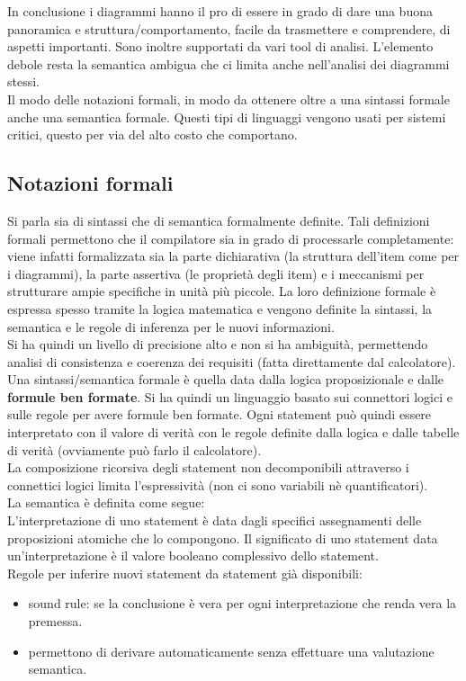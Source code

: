 In conclusione i diagrammi hanno il pro di essere in grado di dare una buona panoramica e struttura/comportamento, facile da trasmettere e comprendere, di aspetti importanti. Sono inoltre supportati da vari tool di analisi. L'elemento debole resta la semantica ambigua che ci limita anche nell'analisi dei diagrammi stessi.\\

Il modo delle notazioni formali, in modo da ottenere oltre a una sintassi formale anche una semantica formale. Questi tipi di linguaggi vengono usati per sistemi critici, questo per via del alto costo che comportano.

\subsection{Notazioni formali}
Si parla sia di sintassi che di semantica formalmente definite. Tali definizioni formali permettono che il compilatore sia in grado di processarle completamente: viene infatti formalizzata sia la parte dichiarativa (la struttura dell’item come per i diagrammi), la parte assertiva (le proprietà degli item) e i meccanismi per strutturare ampie specifiche in unità più piccole. La loro definizione formale è espressa spesso tramite la logica matematica e vengono definite la sintassi, la semantica e le regole di inferenza per le nuovi informazioni.\\
Si ha quindi un livello di precisione alto e non si ha ambiguità, permettendo analisi di consistenza e coerenza dei requisiti (fatta direttamente dal calcolatore).\\

Una sintassi/semantica formale è quella data dalla logica proposizionale e dalle \textbf{formule ben formate}. Si ha quindi un linguaggio basato sui connettori logici e sulle regole per avere formule ben formate. Ogni statement può quindi essere interpretato con il valore di verità con le regole definite dalla logica e dalle tabelle di verità (ovviamente può farlo il calcolatore).\\
La composizione ricorsiva degli statement non decomponibili attraverso i connettici logici limita l’espressività (non ci sono variabili nè quantificatori).\\
La semantica è definita come segue: \\
L’interpretazione di uno statement è data dagli specifici assegnamenti delle proposizioni atomiche che lo compongono. Il significato di uno statement data un’interpretazione è il valore booleano complessivo dello statement.\\
Regole per inferire nuovi statement da statement già disponibili:
\begin{itemize}
    \item sound rule: se la conclusione è vera per ogni interpretazione che renda vera la premessa.
    \item permettono di derivare automaticamente senza effettuare una valutazione semantica.
\end{itemize}

